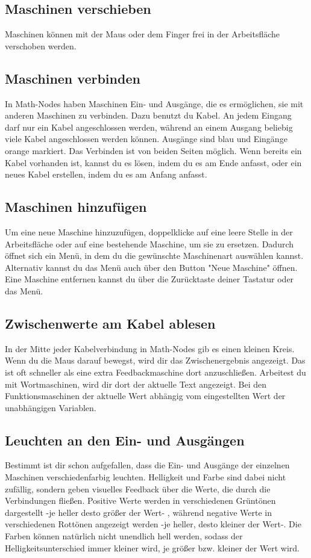 \documentclass[12pt]{report}
\begin{document}
\subsection{Maschinen verschieben}
Maschinen können mit der Maus oder dem Finger frei in der Arbeitsfläche verschoben werden.
\subsection{Maschinen verbinden}
In Math-Nodes haben Maschinen Ein- und Ausgänge, die es ermöglichen, sie mit anderen Maschinen zu verbinden. Dazu benutzt du Kabel. An jedem Eingang darf nur ein Kabel angeschlossen werden, während an einem Ausgang beliebig viele Kabel angeschlossen werden können. Ausgänge sind blau und Eingänge orange markiert. Das Verbinden ist von beiden Seiten möglich. Wenn bereits ein Kabel vorhanden ist, kannst du es lösen, indem du es am Ende anfasst, oder ein neues Kabel erstellen, indem du es am Anfang anfasst.
\subsection{Maschinen hinzufügen}
Um eine neue Maschine hinzuzufügen, doppelklicke auf eine leere Stelle in der Arbeitsfläche oder auf eine bestehende Maschine, um sie zu ersetzen. Dadurch öffnet sich ein Menü, in dem du die gewünschte Maschinenart auswählen kannst. Alternativ kannst du das Menü auch über den Button "Neue Maschine" öffnen. Eine Maschine entfernen kannst du über die Zurücktaste deiner Tastatur oder das Menü.
\subsection{Zwischenwerte am Kabel ablesen}
In der Mitte jeder Kabelverbindung in Math-Nodes gib es einen kleinen Kreis. Wenn du die Maus darauf bewegst, wird dir das Zwischenergebnis angezeigt. Das ist oft schneller als eine extra Feedbackmaschine dort anzuschließen. Arbeitest du mit Wortmaschinen, wird dir dort der aktuelle Text angezeigt. Bei den Funktionsmaschinen der aktuelle Wert abhängig vom eingestellten Wert der unabhängigen Variablen. 
\subsection{Leuchten an den Ein- und Ausgängen}
Bestimmt ist dir schon aufgefallen, dass die Ein- und Ausgänge der einzelnen Maschinen verschiedenfarbig leuchten. Helligkeit und Farbe sind dabei nicht zufällig, sondern geben visuelles Feedback über die Werte, die durch die Verbindungen fließen. Positive Werte werden in verschiedenen Grüntönen dargestellt -je heller desto größer der Wert- , während negative Werte in verschiedenen Rottönen angezeigt werden -je heller, desto kleiner der Wert-. Die Farben können natürlich nicht unendlich hell werden, sodass der Helligkeitsunterschied immer kleiner wird, je größer bzw. kleiner der Wert wird.
\end{document}
